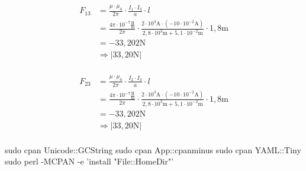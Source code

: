 \begin{enumerate}
        \begin{align*}
          F_{13} & =\frac{\mu\cdot\mu_{0}}{2\pi}\cdot\frac{I_{1}\cdot I_{3}}{a}\cdot l                                                                                                                         \\
                 & =\frac{4\pi\cdot 10^{-7}\frac{\text{H}}{\text{m}}}{2\pi}\cdot\frac{2\cdot 10^{3}\text{A}\cdot(-10\cdot 10^{-2}\text{A})}{2,8\cdot 10^{3}\text{m}+5,1\cdot 10^{-2}\text{m}}\cdot 1,8\text{m} \\
                 & =-33,202\text{N}                                                                                                                                                                            \\
                 & \Rightarrow |33,20\text{N}|                                                                                                                                                                 \\
        \end{align*}

        \begin{align*}
          F_{23} & =\frac{\mu\cdot\mu_{0}}{2\pi}\cdot\frac{I_{2}\cdot I_{3}}{a}\cdot l                                                                                                                         \\
                 & =\frac{4\pi\cdot 10^{-7}\frac{\text{H}}{\text{m}}}{2\pi}\cdot\frac{2\cdot 10^{3}\text{A}\cdot(-10\cdot 10^{-2}\text{A})}{2,8\cdot 10^{3}\text{m}+5,1\cdot 10^{-2}\text{m}}\cdot 1,8\text{m} \\
                 & =-33,202\text{N}                                                                                                                                                                            \\
                 & \Rightarrow |33,20\text{N}|                                                                                                                                                                 \\
        \end{align*}



        sudo cpan Unicode::GCString
        sudo cpan App::cpanminus
        sudo cpan YAML::Tiny
        sudo perl -MCPAN -e 'install "File::HomeDir"'


\end{enumerate}
